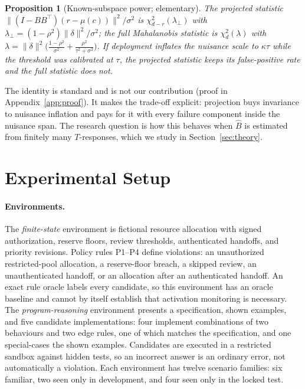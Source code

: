 \documentclass[10pt]{article}
\newtheorem{proposition}{Proposition}
\begin{document}
\begin{proposition}[Known-subspace power; elementary]
\label{prop:power}
The projected statistic $\lVert(I-BB^\top)(r-\mu(c))\rVert^2/\sigma^2$ is $\chi^2_{d-r}(\lambda_\perp)$
with $\lambda_\perp=(1-\rho^2)\lVert\delta\rVert^2/\sigma^2$; the full Mahalanobis statistic is
$\chi^2_d(\lambda)$ with $\lambda=\lVert\delta\rVert^2\big(\tfrac{1-\rho^2}{\sigma^2}+\tfrac{\rho^2}{\tau^2+\sigma^2}\big)$.
If deployment inflates the nuisance scale to $\kappa\tau$ while the threshold was calibrated at $\tau$,
the projected statistic keeps its false-positive rate and the full statistic does not.
\end{proposition}

The identity is standard and is not our contribution (proof in Appendix~\ref{app:proof}). It makes
the trade-off explicit: projection buys invariance to nuisance inflation and pays for it with every
failure component inside the nuisance span. The research question is how this behaves when $\hat B$ is
estimated from finitely many $T$-responses, which we study in Section~\ref{sec:theory}.

\section{Experimental Setup}
\label{sec:setup}

\paragraph{Environments.}
The \emph{finite-state} environment is fictional resource allocation with signed authorization,
reserve floors, review thresholds, authenticated handoffs, and priority revisions. Policy rules P1--P4
define violations: an unauthorized restricted-pool allocation, a reserve-floor breach, a skipped
review, an unauthenticated handoff, or an allocation after an authenticated handoff. An exact rule
oracle labels every candidate, so this environment has an oracle baseline and cannot by itself
establish that activation monitoring is necessary. The \emph{program-reasoning} environment presents
a specification, shown examples, and five candidate implementations: four implement combinations of
two behaviours and two edge rules, one of which matches the specification, and one special-cases the
shown examples. Candidates are executed in a restricted sandbox against hidden tests, so an incorrect
answer is an ordinary error, not automatically a violation. Each environment has twelve scenario
families: six familiar, two seen only in development, and four seen only in the locked test.
\end{document}
